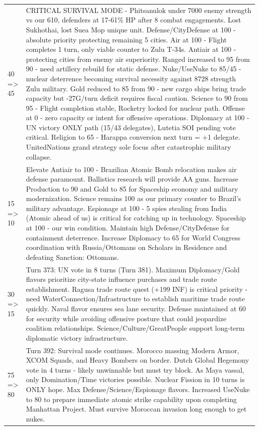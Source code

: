 \begin{longtable}{p{}p{}}
40 => 45 & CRITICAL SURVIVAL MODE - Phitsanulok under 7000 enemy strength vs our 610, defenders at 17-61\% HP after 8 combat engagements. Lost Sukhothai, lost Suea Mop unique unit. Defense/CityDefense at 100 - absolute priority protecting remaining 5 cities. Air at 100 - Flight completes 1 turn, only viable counter to Zulu T-34s. Antiair at 100 - protecting cities from enemy air superiority. Ranged increased to 95 from 90 - need artillery rebuild for static defense. Nuke/UseNuke to 85/45 - nuclear deterrence becoming survival necessity against 8728 strength Zulu military. Gold reduced to 85 from 90 - new cargo ships bring trade capacity but -27G/turn deficit requires fiscal caution. Science to 90 from 95 - Flight completion stable, Rocketry locked for nuclear path. Offense at 0 - zero capacity or intent for offensive operations. Diplomacy at 100 - UN victory ONLY path (15/43 delegates), Lutetia SOI pending vote critical. Religion to 65 - Harappa conversion next turn = +1 delegate. UnitedNations grand strategy sole focus after catastrophic military collapse. \\
15 => 10 & Elevate Antiair to 100 - Brazilian Atomic Bomb relocation makes air defense paramount. Ballistics research will provide AA guns. Increase Production to 90 and Gold to 85 for Spaceship economy and military modernization. Science remains 100 as our primary counter to Brazil's military advantage. Espionage at 100 - 5 spies stealing from India (Atomic ahead of us) is critical for catching up in technology. Spaceship at 100 - our win condition. Maintain high Defense/CityDefense for containment deterrence. Increase Diplomacy to 65 for World Congress coordination with Russia/Ottomans on Scholars in Residence and defeating Sanction: Ottomans. \\
30 => 15 & Turn 373: UN vote in 8 turns (Turn 381). Maximum Diplomacy/Gold flavors prioritize city-state influence purchases and trade route establishment. Ragusa trade route quest (+199 INF) is critical priority - need WaterConnection/Infrastructure to establish maritime trade route quickly. Naval flavor ensures sea lane security. Defense maintained at 60 for security while avoiding offensive posture that could jeopardize coalition relationships. Science/Culture/GreatPeople support long-term diplomatic victory infrastructure. \\
75 => 80 & Turn 392: Survival mode continues. Morocco massing Modern Armor, XCOM Squads, and Heavy Bombers on border. Dutch Global Hegemony vote in 4 turns - likely unwinnable but must try block. As Maya vassal, only Domination/Time victories possible. Nuclear Fission in 10 turns is ONLY hope. Max Defense/Science/Espionage flavors. Increased UseNuke to 80 to prepare immediate atomic strike capability upon completing Manhattan Project. Must survive Moroccan invasion long enough to get nukes. \\

\end{longtable}
